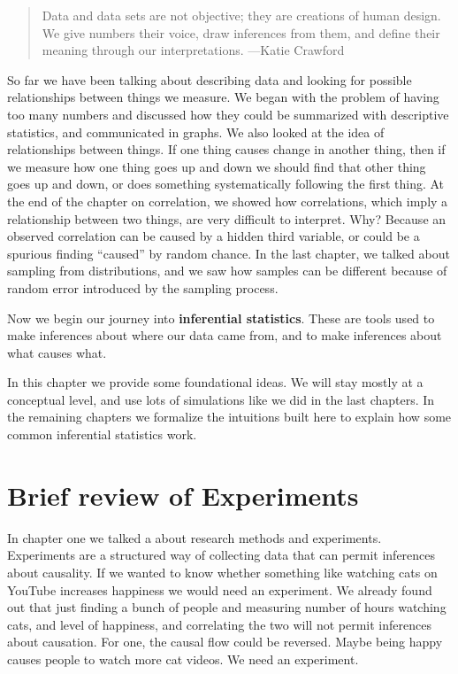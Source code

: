 \documentclass[
  letterpaper,
  DIV=11,
  numbers=noendperiod]{scrreprt}
\begin{document}
\begin{quote}
Data and data sets are not objective; they are creations of human
design. We give numbers their voice, draw inferences from them, and
define their meaning through our interpretations. ---Katie Crawford
\end{quote}

So far we have been talking about describing data and looking for
possible relationships between things we measure. We began with the
problem of having too many numbers and discussed how they could be
summarized with descriptive statistics, and communicated in graphs. We
also looked at the idea of relationships between things. If one thing
causes change in another thing, then if we measure how one thing goes up
and down we should find that other thing goes up and down, or does
something systematically following the first thing. At the end of the
chapter on correlation, we showed how correlations, which imply a
relationship between two things, are very difficult to interpret. Why?
Because an observed correlation can be caused by a hidden third
variable, or could be a spurious finding ``caused'' by random chance. In
the last chapter, we talked about sampling from distributions, and we
saw how samples can be different because of random error introduced by
the sampling process.

Now we begin our journey into \textbf{inferential statistics}. These are
tools used to make inferences about where our data came from, and to
make inferences about what causes what.

In this chapter we provide some foundational ideas. We will stay mostly
at a conceptual level, and use lots of simulations like we did in the
last chapters. In the remaining chapters we formalize the intuitions
built here to explain how some common inferential statistics work.

\section{Brief review of Experiments}\label{brief-review-of-experiments}

In chapter one we talked a about research methods and experiments.
Experiments are a structured way of collecting data that can permit
inferences about causality. If we wanted to know whether something like
watching cats on YouTube increases happiness we would need an
experiment. We already found out that just finding a bunch of people and
measuring number of hours watching cats, and level of happiness, and
correlating the two will not permit inferences about causation. For one,
the causal flow could be reversed. Maybe being happy causes people to
watch more cat videos. We need an experiment.
\end{document}
